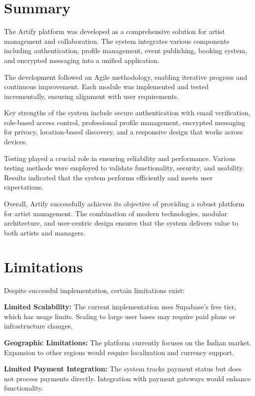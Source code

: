 \documentclass[12pt,a4paper]{report}
\begin{document}
\clearpage
{}
\setcounter{section}{0}

\section{Summary}

The Artify platform was developed as a comprehensive solution for artist management and collaboration. The system integrates various components including authentication, profile management, event publishing, booking system, and encrypted messaging into a unified application.

The development followed an Agile methodology, enabling iterative progress and continuous improvement. Each module was implemented and tested incrementally, ensuring alignment with user requirements.

Key strengths of the system include secure authentication with email verification, role-based access control, professional profile management, encrypted messaging for privacy, location-based discovery, and a responsive design that works across devices.

Testing played a crucial role in ensuring reliability and performance. Various testing methods were employed to validate functionality, security, and usability. Results indicated that the system performs efficiently and meets user expectations.

Overall, Artify successfully achieves its objective of providing a robust platform for artist management. The combination of modern technologies, modular architecture, and user-centric design ensures that the system delivers value to both artists and managers.

\section{Limitations}

Despite successful implementation, certain limitations exist:

\textbf{Limited Scalability:}  
The current implementation uses Supabase's free tier, which has usage limits. Scaling to large user bases may require paid plans or infrastructure changes.

\textbf{Geographic Limitations:}  
The platform currently focuses on the Indian market. Expansion to other regions would require localization and currency support.

\textbf{Limited Payment Integration:}  
The system tracks payment status but does not process payments directly. Integration with payment gateways would enhance functionality.
\end{document}
